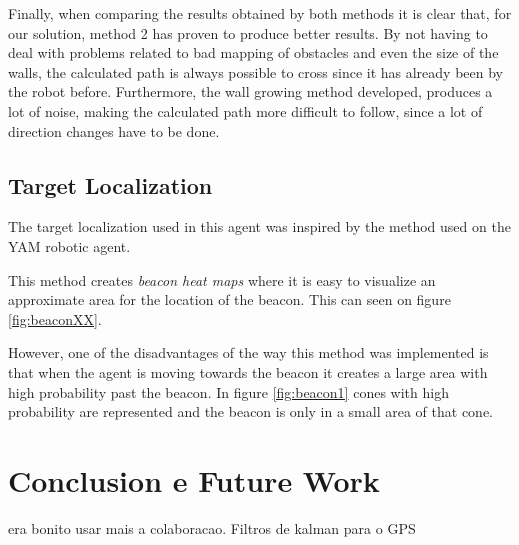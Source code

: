 \documentclass[oribibl]{llncs}
\begin{document}
Finally, when comparing the results obtained by both methods it is clear that, for our solution, method 2 has proven to produce better results. By not having to deal with problems related to bad mapping of obstacles and even the size of the walls, the calculated path is always possible to cross since it has already been by the robot before. Furthermore, the wall growing method developed, produces a lot of noise, making the calculated path more difficult to follow, since a lot of direction changes have to be done.


\subsection{Target Localization}
The target localization used in this agent was inspired by the method used on the
YAM robotic agent.\cite{Ribeiro2002}

This method creates \textit{beacon heat maps} where it is easy to visualize an approximate
area for the location of the beacon. This can seen on figure \ref{fig:beaconXX}.

However, one of the disadvantages of the way this method was implemented is that when the agent
is moving towards the beacon it creates a large area with high probability past the beacon.
In figure \ref{fig:beacon1} cones with high probability are represented and the beacon is only in a small area of that cone.


\section{Conclusion e Future Work}
era bonito usar mais a colaboracao.
Filtros de kalman para o GPS



\end{document}
